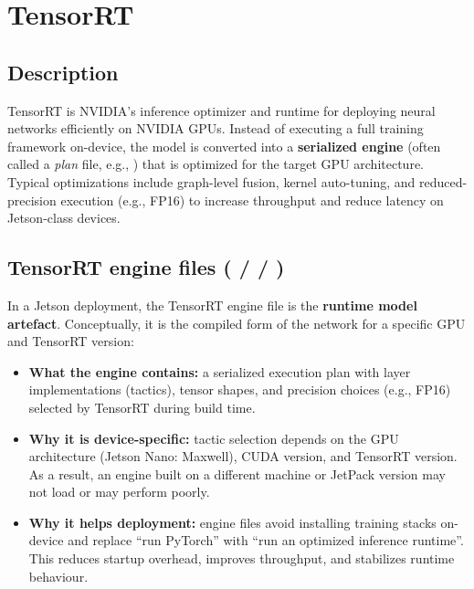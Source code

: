 \section{TensorRT}
\label{sec:deployment_tensorrt}

\subsection{Description}

\noindent
TensorRT is NVIDIA's inference optimizer and runtime for deploying neural networks efficiently on NVIDIA GPUs.
Instead of executing a full training framework on-device, the model is converted into a \textbf{serialized engine} (often called a \emph{plan} file, e.g., ) that is optimized for the target GPU architecture.
Typical optimizations include graph-level fusion, kernel auto-tuning, and reduced-precision execution (e.g., FP16) to increase throughput and reduce latency on Jetson-class devices.

\subsection{TensorRT engine files ( /  / )}
\label{sec:tensorrt_engine_files}

\noindent
In a Jetson deployment, the TensorRT engine file is the \textbf{runtime model artefact}.
Conceptually, it is the compiled form of the network for a specific GPU and TensorRT version:
\begin{itemize}
	\item \textbf{What the engine contains:} a serialized execution plan with layer implementations (tactics), tensor shapes, and precision choices (e.g., FP16) selected by TensorRT during build time.
	\item \textbf{Why it is device-specific:} tactic selection depends on the GPU architecture (Jetson Nano: Maxwell), CUDA version, and TensorRT version. As a result, an engine built on a different machine or JetPack version may not load or may perform poorly.
	\item \textbf{Why it helps deployment:} engine files avoid installing training stacks on-device and replace ``run PyTorch'' with ``run an optimized inference runtime''. This reduces startup overhead, improves throughput, and stabilizes runtime behaviour.
\end{itemize}

